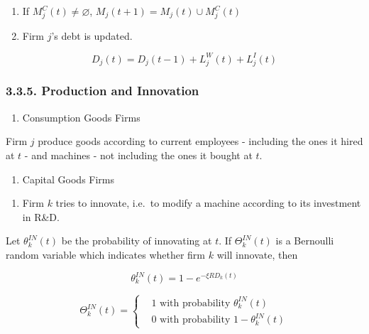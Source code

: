 \documentclass[11pt,]{article}
\providecommand{\tightlist}{%
\setlength{\itemsep}{0pt}\setlength{\parskip}{0pt}}
\begin{document}
\begin{enumerate}
\def\labelenumi{\alph{enumi}.}
\setcounter{enumi}{5}
\item
  If \(M^C_j(t) \neq \varnothing\), \(M_j(t+1) = M_j(t) \cup M^C_j(t)\)
\item
  Firm \(j\)'s debt is updated.
\end{enumerate}

\begin{equation}
  D_j(t) = D_j(t-1) + L_j^W(t) + L_j^I(t)
\end{equation}

\subsubsection{3.3.5. Production and
Innovation}\label{production-and-innovation}

\begin{enumerate}
\def\labelenumi{\roman{enumi}.}
\tightlist
\item
  Consumption Goods Firms
\end{enumerate}

Firm \(j\) produce goods according to current employees - including the
ones it hired at \(t\) - and machines - not including the ones it bought
at \(t\).

\begin{enumerate}
\def\labelenumi{\roman{enumi}.}
\setcounter{enumi}{1}
\tightlist
\item
  Capital Goods Firms
\end{enumerate}

\begin{enumerate}
\def\labelenumi{\alph{enumi}.}
\tightlist
\item
  Firm \(k\) tries to innovate, i.e.~to modify a machine according to
  its investment in R\&D.
\end{enumerate}

Let \(\theta_k^{IN}(t)\) be the probability of innovating at \(t\). If
\(\Theta^{IN}_k(t)\) is a Bernoulli random variable which indicates
whether firm \(k\) will innovate, then

\begin{equation}
  \theta_k^{IN}(t) = 1 - e^{-\xi RD_k(t)}
\end{equation}

\begin{equation}
  \Theta^{IN}_k(t) = 
  \begin{cases}
    & 1 \text{ with probability } \theta_k^{IN}(t) \\
    & 0 \text{ with probability } 1 - \theta_k^{IN}(t)
  \end{cases}
\end{equation}
\end{document}
